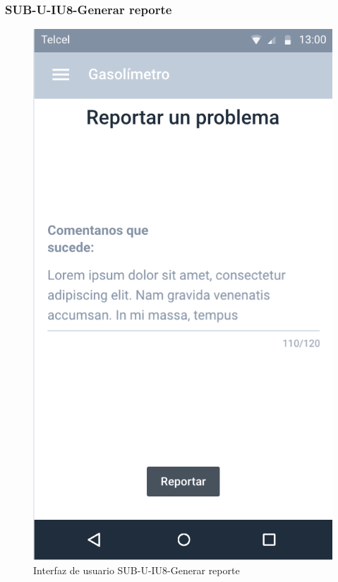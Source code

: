 \subsubsection{SUB-U-IU8-Generar reporte}\label{SUB-U-IU8}
\begin{figure}[H]
	\centering
	\includegraphics[scale=1]{Capitulo4/software/submodulos/usuarios/images/sub-u-iu8}
	\caption{Interfaz de usuario SUB-U-IU8-Generar reporte}
	\label{fig:sub-u-iu8}
\end{figure}